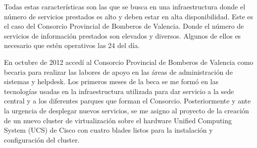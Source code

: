 \documentclass[12pt,a4paper,titlepage,twoside]{report}
\begin{document}
\par 
Todas estas características son las que se busca en una infraestructura donde el número de servicios prestados es alto y deben estar en alta disponibilidad. Este es el caso del Consorcio Provincial de Bomberos de Valencia. Donde el número de servicios de información prestados son elevados y diversos. Algunos de ellos es necesario que estén operativos las 24 del día. 
\par
En octubre de 2012 accedí al Consorcio Provincial de Bomberos de Valencia como becaria para realizar las labores de apoyo en las áreas de administración de sistemas y helpdesk. Los primeros meses de la beca se me formó en las tecnologías usadas en la infraestructura utilizada para dar servicio a la sede central y a los diferentes parques que forman el Consorcio. Posteriormente y ante la urgencia de desplegar nuevos servicios, se me asigno al proyecto de la creación de un nuevo cluster de virtualización sobre el hardware Unified Computing System (UCS) de Cisco con cuatro blades listos para la instalación y configuración del cluster.
\end{document}
